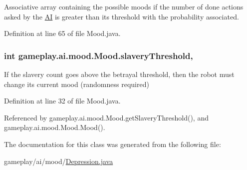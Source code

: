 Associative array containing the possible moods if the number of done actions asked by the \hyperlink{classgameplay_1_1ai_1_1_a_i}{A\-I} is greater than its threshold with the probability associated. 



Definition at line 65 of file Mood.\-java.

\hypertarget{classgameplay_1_1ai_1_1mood_1_1_mood_a12c9abed7c077f9013956cda08e41619}{
\subsubsection[{slavery\-Threshold}]{\setlength{\rightskip}{0pt plus 5cm}int gameplay.\-ai.\-mood.\-Mood.\-slavery\-Threshold\hspace{0.3cm}{\ttfamily [protected]}, {\ttfamily [inherited]}}}\label{classgameplay_1_1ai_1_1mood_1_1_mood_a12c9abed7c077f9013956cda08e41619}


If the slavery count goes above the betrayal threshold, then the robot must change its current mood (randomness required) 



Definition at line 32 of file Mood.\-java.



Referenced by gameplay.\-ai.\-mood.\-Mood.\-get\-Slavery\-Threshold(), and gameplay.\-ai.\-mood.\-Mood.\-Mood().



The documentation for this class was generated from the following file\-:\begin{DoxyCompactItemize}
\item 
gameplay/ai/mood/\hyperlink{_depression_8java}{Depression.\-java}\end{DoxyCompactItemize}
